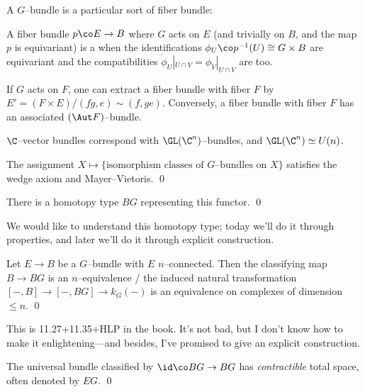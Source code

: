 A $G$--bundle is a particular sort of fiber bundle:

\begin{definition}
A fiber bundle $p\co E \to B$ where $G$ acts on $E$ (and trivially on $B$, and the map $p$ is equivariant) is a  when the identifications $\phi_U\co p^{-1}(U) \cong G \times B$ are equivariant and the compatibilities $\phi_U|_{U \cap V} = \phi_V|_{U \cap V}$ are too.
\end{definition}

\begin{remark}
If $G$ acts on $F$, one can extract a fiber bundle with fiber $F$ by $E' = (F \times E) / (fg, e) \sim (f, ge)$.  Conversely, a fiber bundle with fiber $F$ has an associated $(\Aut F)$--bundle.
\end{remark}

\begin{remark}
$\C$--vector bundles correspond with $\GL(\C^n)$--bundles, and $\GL(\C^n) \simeq U(n)$.
\end{remark}

\begin{lemma}
The assignment $X \mapsto \{\text{isomorphism classes of $G$--bundles on $X$}\}$ satisfies the wedge axiom and Mayer--Vietoris. \qed
\end{lemma}

\begin{corollary}
There is a homotopy type $BG$ representing this functor. \qed
\end{corollary}

We would like to understand this homotopy type; today we'll do it through properties, and later we'll do it through explicit construction.

\begin{lemma}
Let $E \to B$ be a $G$--bundle with $E$ $n$--connected.  Then the classifying map $B \to BG$ is an $n$--equivalence / the induced natural transformation $[-, B] \to [-, BG] \to k_G(-)$ is an equivalence on complexes of dimension $\le n$. \qed 
\end{lemma}

\begin{remark}
This is 11.27+11.35+HLP in the book.  It's not bad, but I don't know how to make it enlightening---and besides, I've promised to give an explicit construction.
\end{remark}

\begin{corollary}
The universal bundle classified by $\id\co BG \to BG$ has \emph{contractible} total space, often denoted by $EG$. \qed
\end{corollary}

